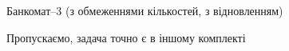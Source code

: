 ﻿\begin{problemAllDefault}{Банкомат--3 (з обмеженнями кількостей, з відновленням)}\label{problem:ATM-limited}

Пропускаємо, задача точно є в іншому комплекті

\end{problemAllDefault}